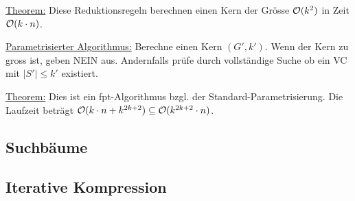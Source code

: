 \underline{Theorem:}
Diese Reduktionsregeln berechnen einen Kern der Grösse $\mathcal{O} (k^2)$ in Zeit $\mathcal{O} (k \cdot n)$.

\underline{Parametrisierter Algorithmus:}
Berechne einen Kern $(G', k')$. Wenn der Kern zu gross ist, geben NEIN aus.
Andernfalls prüfe durch vollständige Suche ob ein VC mit $|S'| \leq k'$ existiert.

\underline{Theorem:}
Dies ist ein fpt-Algorithmus bzgl. der Standard-Parametrisierung. Die Laufzeit beträgt
$\mathcal{O} (k \cdot n + k^{2k+2}) \subseteq \mathcal{O} (k^{2k+2} \cdot n)$.


\subsection{Suchbäume}


\subsection{Iterative Kompression}


